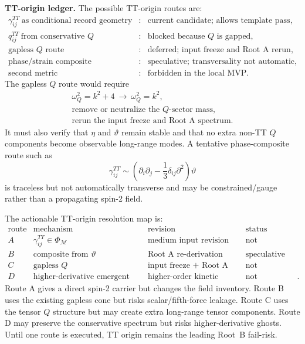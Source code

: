 \documentclass[11pt]{article}
\begin{document}
\medskip\noindent\textbf{TT-origin ledger.}
The possible TT-origin routes are:
\[
\boxed{
\begin{array}{lll}
\gamma^{TT}_{ij}\ \text{as conditional record geometry}
&:& \text{current candidate; allows template pass},\\
q^{TT}_{ij}\ \text{from conservative }Q
&:& \text{blocked because }Q\text{ is gapped},\\
\text{gapless }Q\text{ route}
&:& \text{deferred; input freeze and Root A rerun},\\
\text{phase/strain composite}
&:& \text{speculative; transversality not automatic},\\
\text{second metric}
&:& \text{forbidden in the local MVP}.
\end{array}}
\]
The gapless \(Q\) route would require
\[
\boxed{
\begin{array}{l}
\omega_Q^2=k^2+4\ \to\ \omega_Q^2=k^2,\\
\text{remove or neutralize the }Q\text{-sector mass},\\
\text{rerun the input freeze and Root A spectrum}.
\end{array}
}
\]
It must also verify that \(\eta\) and \(\vartheta\) remain stable and that no
extra non-TT \(Q\) components become observable long-range modes.  A tentative
phase-composite route such as
\[
\boxed{
\gamma^{TT}_{ij}\sim
\left(\partial_i\partial_j-\frac13\delta_{ij}\partial^2\right)\vartheta
}
\]
is traceless but not automatically transverse and may be constrained/gauge
rather than a propagating spin-2 field.

The actionable TT-origin resolution map is:
\[
\boxed{
\begin{array}{llll}
\text{route} & \text{mechanism} & \text{revision} & \text{status}\\
A & \gamma^{TT}_{ij}\in\Phi_{\mathcal M} & \text{medium input revision} & \text{not attempted}\\
B & \text{composite from }\vartheta & \text{Root A re-derivation} & \text{speculative}\\
C & \text{gapless }Q & \text{input freeze + Root A rerun} & \text{not attempted}\\
D & \text{higher-derivative emergent tensor} & \text{higher-order kinetic audit} & \text{not attempted}.
\end{array}}
\]
Route A gives a direct spin-2 carrier but changes the field inventory.  Route
B uses the existing gapless cone but risks scalar/fifth-force leakage.  Route
C uses the tensor \(Q\) structure but may create extra long-range tensor
components.  Route D may preserve the conservative spectrum but risks
higher-derivative ghosts.  Until one route is executed, TT origin remains the
leading Root~B fail-risk.
\end{document}
